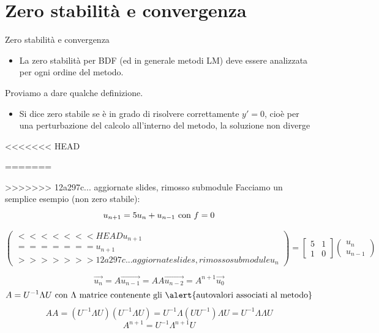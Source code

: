 \documentclass[aspectratio=169, 10pt, handout,usenames,dvipsnames]{beamer}
\begin{document}
\section{Zero stabilità e convergenza}\label{sec:sec9}
    \begin{frame}{Zero stabilità e convergenza}
        \begin{itemize}
            \item La zero stabilità per BDF (ed in generale metodi LM) deve essere analizzata per ogni ordine del metodo.
        \end{itemize}
        Proviamo a dare qualche definizione.
        \begin{itemize}
            \item Si dice \alert{zero stabile} se è in grado di risolvere correttamente \( y'=0 \), cioè per una perturbazione del calcolo all’interno del metodo, la soluzione non diverge
        \end{itemize}
<<<<<<< HEAD

=======

>>>>>>> 12a297c... aggiornate slides, rimosso submodule
       Facciamo un semplice esempio (non zero stabile):
        \[u_{n+1} = 5 u_n + u_{n-1}  \textnormal{ con } f = 0\]
        \begin{center}
         $\begin{pmatrix}
<<<<<<< HEAD
            u_{n+1} \\
=======
            u_{n+1} \\
>>>>>>> 12a297c... aggiornate slides, rimosso submodule
            u_{n}
         \end{pmatrix}
         =
         \begin{bmatrix}
                    5 & 1 \\
                    1 & 0
         \end{bmatrix}
        \begin{pmatrix}
            u_{n} \\
            u_{n-1}
         \end{pmatrix} $
         \end{center}
         \[\vec{u_n} = A \vec{u_{n-1}} = AA \vec{u_{n-2}}= A^{n+1} \vec{u_0} \]
         \[A = U^ {-1} \Lambda U  \textnormal{ con } \Lambda \textnormal{ matrice contenente gli \alert{autovalori associati al metodo}} \]
         \[AA = (U^ {-1} \Lambda U)(U^ {-1} \Lambda U) = U^{-1} \Lambda (U U^{-1}) \Lambda U = U^{-1} \Lambda \Lambda U \]
         \[A^{n+1} = U^{-1} \Lambda^{n+1} U\]


\end{frame}
\end{document}
